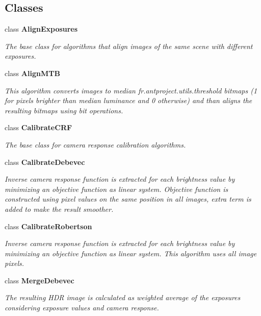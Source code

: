 \subsection*{Classes}
\begin{DoxyCompactItemize}
\item 
class {\bfseries Align\+Exposures}
\begin{DoxyCompactList}\small\item\em The base class for algorithms that align images of the same scene with different exposures. \end{DoxyCompactList}\item 
class {\bfseries Align\+M\+TB}
\begin{DoxyCompactList}\small\item\em This algorithm converts images to median fr.antproject.utils.threshold bitmaps (1 for pixels brighter than median luminance and 0 otherwise) and than aligns the resulting bitmaps using bit operations. \end{DoxyCompactList}\item
class {\bfseries Calibrate\+C\+RF}
\begin{DoxyCompactList}\small\item\em The base class for camera response calibration algorithms. \end{DoxyCompactList}\item 
class {\bfseries Calibrate\+Debevec}
\begin{DoxyCompactList}\small\item\em Inverse camera response function is extracted for each brightness value by minimizing an objective function as linear system. Objective function is constructed using pixel values on the same position in all images, extra term is added to make the result smoother. \end{DoxyCompactList}\item 
class {\bfseries Calibrate\+Robertson}
\begin{DoxyCompactList}\small\item\em Inverse camera response function is extracted for each brightness value by minimizing an objective function as linear system. This algorithm uses all image pixels. \end{DoxyCompactList}\item 
class {\bfseries Merge\+Debevec}
\begin{DoxyCompactList}\small\item\em The resulting H\+DR image is calculated as weighted average of the exposures considering exposure values and camera response. \end{DoxyCompactList}\item 

\end{DoxyCompactItemize}
